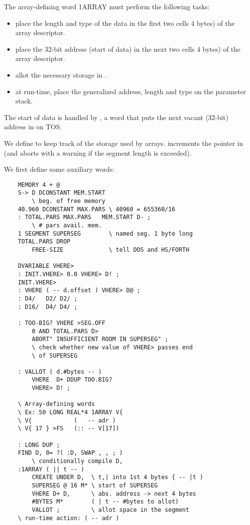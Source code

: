 The array-defining word 1ARRAY must perform the following
tasks:

\begin{itemize}
    \item place the length and type of the data in the first two cells 4 bytes) of the array descriptor.
    \item place the 32-bit address (start of data) in the next two cells 4 bytes) of the array descriptor.
    \item allot the necessary storage in .
    \item at run-time, place the generalized address, length and type on the parameter stack.
\end{itemize}

The start of data is handled by , a word that puts the next vacant (32-bit) address in  on TOS.

We define  to keep track of the storage used by arrays.  increments the pointer in  (and aborts with a warning if the segment length is exceeded).

We first define some auxiliary words:
\begin{lstlisting}
    MEMORY 4 + @
    S-> D DCONSTANT MEM.START
        \ beg. of free memory
    40.960 DCONSTANT MAX.PARS \ 40960 = 655360/16
    : TOTAL.PARS MAX.PARS   MEM.START D- ;
        \ # pars avail. mem.
    1 SEGMENT SUPERSEG        \ named seg. 1 byte long
    TOTAL.PARS DROP
        FREE-SIZE             \ tell DOS and HS/FORTH

    DVARIABLE VHERE>
    : INIT.VHERE> 0.0 VHERE> D! ;
    INIT.VHERE>
    : VHERE ( -- d.offset ) VHERE> D@ ;
    : D4/   D2/ D2/ ;
    : D16/  D4/ D4/ ;

    : TOO-BIG? VHERE >SEG.OFF
        0 AND TOTAL.PARS D>
        ABORT" INSUFFICIENT ROOM IN SUPERSEG" ;
        \ check whether new value of VHERE> passes end
        \ of SUPERSEG

    : VALLOT ( d.#bytes -- )
        VHERE  D+ DDUP TOO.BIG?
        VHERE> D! ;

    \ Array-defining words
    \ Ex: 50 LONG REAL*4 1ARRAY V{
    \ V{            (   -- adr )
    \ V{ 17 } >FS   (:: -- V[17])

    : LONG DUP ;
    FIND D, 0= ?( :D, SWAP , , ; )
        \ conditionally compile D,
    :1ARRAY ( || t -- )
        CREATE UNDER D,  \ t,| into 1st 4 bytes { -- |t )
        SUPERSEG @ 16 M* \ start of SUPERSEG
        VHERE D+ D,      \ abs. address -> next 4 bytes
        #BYTES M*        ( | t -- #bytes to allot)
        VALLOT ;         \ allot space in the segment
    \ run-time action: ( -- adr )
\end{lstlisting}

